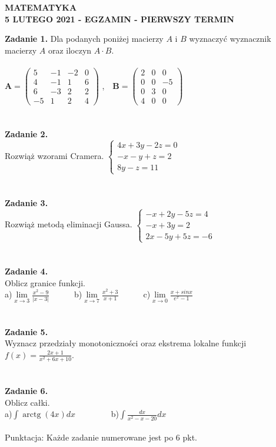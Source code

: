 \documentclass[12pt,a4paper]{report}
\begin{document}
\begin{center}

\textbf{MATEMATYKA \\5 LUTEGO 2021 - EGZAMIN - PIERWSZY TERMIN}

\end{center}\textbf{Zadanie 1.} Dla podanych poniżej macierzy $A$ i $B$ wyznaczyć wyznacznik macierzy $A$ oraz iloczyn $A\cdot B$. \\\\ $\mathbf{A} =\left( \begin{array}{cccc}5 & -1& -2 & 0\\4 & -1&1 & 6\\6 & -3& 2 & 2\\-5 & 1 & 2 & 4 \end{array} \right)$ ,\ \ $\mathbf{B} =\left( \begin{array}{ccc}2 & 0& 0\\0 & 0& -5\\0 & 3& 0\\4 & 0& 0\end{array} \right)$\\\\\\\textbf{Zadanie 2.} \\Rozwiąż wzorami Cramera. $\left\{ \begin{array}{ll}4x+3y-2z=0\\-x-y+z=2\\8y-z=11\end{array} \right.$\\\\\\\textbf{Zadanie 3.}  \\Rozwiąż metodą eliminacji Gaussa. $\left\{ \begin{array}{ll}-x+2y-5z=4\\-x+3y=2\\2x-5y+5z=-6\end{array} \right.$\\\\\\\textbf{Zadanie 4.} \\Oblicz granice funkcji.\\a)$\lim\limits_{x\to 3}\frac{x^2-9}{\vert x-3\vert}$\ \ \ \ \ \  b)$\lim\limits_{x\to 7}\frac{x^2+3}{x+1}$\ \ \ \ \ \ c)$\lim\limits_{x\to 0} \frac{x+sinx}{e^x-1}$\\\\\\\textbf{Zadanie 5.}\\Wyznacz przedziały monotoniczności oraz ekstrema lokalne funkcji $f(x)=\frac{2x+1}{x^2+6x+10}$.\\\\\\\textbf{Zadanie 6.} \\Oblicz całki. \\a)$\int \operatorname{arctg}(4x) dx$ \ \ \ \ \ \ \ \ b)$\int \frac{dx}{x^2-x-20} dx$\\\\Punktacja: Każde zadanie numerowane jest po 6 pkt.
\end{document}
